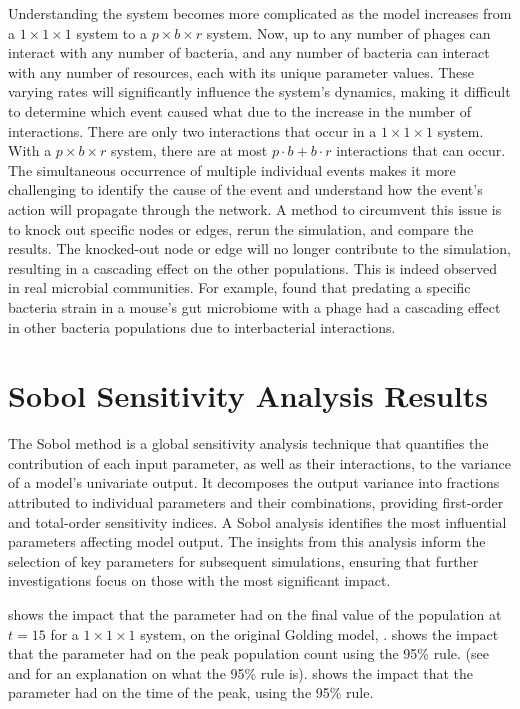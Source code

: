 Understanding the system becomes more complicated as the model increases from a $1\times1\times1$ system to a $p\times b\times r$ system. 
Now, up to any number of phages can interact with any number of bacteria, and any number of bacteria can interact with any number of resources, each with its unique parameter values. 
These varying rates will significantly influence the system’s dynamics, making it difficult to determine which event caused what due to the increase in the number of interactions.
There are only two interactions that occur in a $1\times1\times1$ system. 
With a $p\times b\times r$ system, there are at most $p\cdot b + b\cdot r$ interactions that can occur. 
The simultaneous occurrence of multiple individual events makes it more challenging to identify the cause of the event and understand how the event’s action will propagate through the network. 
A method to circumvent this issue is to knock out specific nodes or edges, rerun the simulation, and compare the results. 
The knocked-out node or edge will no longer contribute to the simulation, resulting in a cascading effect on the other populations. 
This is indeed observed in real microbial communities. 
For example, \citet{hsuDynamicModulationGut2019} found that predating a specific bacteria strain in a mouse’s gut microbiome with a phage had a cascading effect in other bacteria populations due to interbacterial interactions. 

\section{Sobol Sensitivity Analysis Results}
\label{sec:Sobol_sensitivity_analysis_results}
The Sobol method is a global sensitivity analysis technique that quantifies the contribution of each input parameter, as well as their interactions, to the variance of a model’s univariate output. 
It decomposes the output variance into fractions attributed to individual parameters and their combinations, providing first-order and total-order sensitivity indices.
A Sobol analysis identifies the most influential parameters affecting model output. 
The insights from this analysis inform the selection of key parameters for subsequent simulations, ensuring that further investigations focus on those with the most significant impact.

 shows the impact that the parameter had on the final value of the population at $t=15$ for a $1\times 1\times 1$ system, on the original Golding model, . 
 shows the impact that the parameter had on the peak population count using the 95\% rule. 
(see  and  for an explanation on what the 95\% rule is). 
 shows the impact that the parameter had on the time of the peak, using the 95\% rule. 

